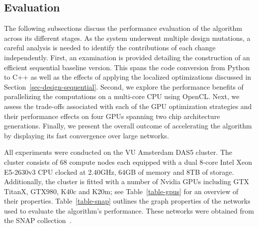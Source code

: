 \subsection{Evaluation}
\label{sec-evaluation}

The following subsections discuss the performance evaluation of the algorithm
across its different stages. As the system underwent multiple design mutations,
a careful analysis is needed to identify the contributions of each change
independently.
%
First, an examination is provided detailing the construction of an efficient
sequential baseline version.
This spans
the code conversion from Python to C++ as well as the effects of applying
the localized optimizations discussed in
Section~\ref{sec-design-sequential}.
%
Second, we explore the performance benefits of parallelizing the computations
on a multi-core CPU using OpenCL.
%
Next, we assess the trade-offs associated with each of the GPU optimization
strategies and their performance effects on four GPUs spanning two chip
architecture generations.
%
Finally, we present the overall outcome of accelerating the algorithm by
displaying its fast convergence over large networks.

All experiments were conducted on the VU Amsterdam DAS5 cluster. The cluster
consists of 68 compute nodes each equipped with a dual 8-core Intel Xeon
E5-2630v3 CPU clocked at 2.40GHz, 64GB of memory and 8TB of storage.
Additionally, the cluster is fitted with a number of Nvidia GPUs including GTX
TitanX, GTX980, K40c and K20m; see Table~\ref{table-gpus} for an overview of
their properties. Table~\ref{table-snap} outlines the graph
properties of the networks used to evaluate the algorithm's performance. These
networks were obtained from the SNAP collection~\cite{snapnets}.

\begin{comment}
\begin{table}[tb]
\center\begin{tabular}{l r r c}
Network & \#Vertices & \#Edges \\
\hline
CA-HepPh        &    12,008 &    118,521 \\
com-DBLP        &   317,080 &  1,049,866 \\
com-LiveJournal & 3,997,962 & 34,681,189 \\
\hline
\\[-1ex]
\end{tabular}
\caption{Network graphs from the Stanford Snap collection}
\label{table-snap}
\end{table}
\end{comment}

